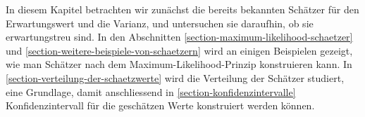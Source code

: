 In diesem Kapitel betrachten wir zunächst die bereits bekannten 
Schätzer für den Erwartungswert und die Varianz, und untersuchen
sie daraufhin, ob sie erwartungstreu sind.
In den Abschnitten \ref{section-maximum-likelihood-schaetzer}
und \ref{section-weitere-beispiele-von-schaetzern} wird an einigen
Beispielen gezeigt, wie man Schätzer nach dem
Maximum-Likelihood-Prinzip konstruieren kann.
In \ref{section-verteilung-der-schaetzwerte}
wird die Verteilung der Schätzer studiert, eine Grundlage, damit
anschliessend in \ref{section-konfidenzintervalle} Konfidenzintervall
für die geschätzen Werte konstruiert werden können.

